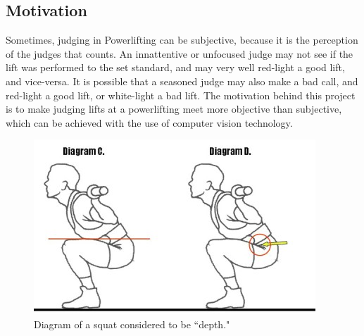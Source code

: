 \subsection{Motivation}
Sometimes, judging in Powerlifting can be subjective, because it is the perception of the judges that counts.  An innattentive or unfocused judge may not see if the lift was performed to the set standard, and may very well red-light a good lift, and vice-versa. It is possible that a seasoned judge may also make a bad call, and red-light a good lift, or white-light a bad lift. The motivation behind this project is to make judging lifts at a powerlifting meet more objective than subjective, which can be achieved with the use of computer vision technology. 
\begin{figure}[t]
  \centering
   \includegraphics[width=0.8\linewidth]{squat-depth.jpg}

   \caption{Diagram of a squat considered to be ``depth."}
   \label{fig:onecol}
\end{figure}


